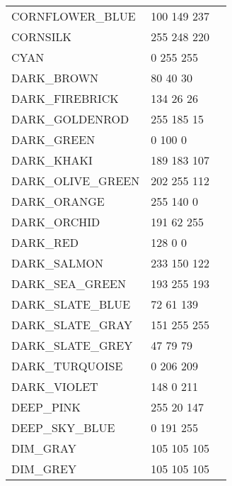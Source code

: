 \begin{longtable}{l|l|l}
CORNFLOWER\_BLUE & 100 149 237 & \colorbox[RGB]{100 149 237}{\phantom{MMMMMMMM}}\\
CORNSILK & 255 248 220 & \colorbox[RGB]{255 248 220}{\phantom{MMMMMMMM}}\\
CYAN & 0 255 255 & \colorbox[RGB]{0 255 255}{\phantom{MMMMMMMM}}\\
DARK\_BROWN & 80 40 30 & \colorbox[RGB]{80 40 30}{\phantom{MMMMMMMM}}\\
DARK\_FIREBRICK & 134 26 26 & \colorbox[RGB]{134 26 26}{\phantom{MMMMMMMM}}\\
DARK\_GOLDENROD & 255 185 15 & \colorbox[RGB]{255 185 15}{\phantom{MMMMMMMM}}\\
DARK\_GREEN & 0 100 0 & \colorbox[RGB]{0 100 0}{\phantom{MMMMMMMM}}\\
DARK\_KHAKI & 189 183 107 & \colorbox[RGB]{189 183 107}{\phantom{MMMMMMMM}}\\
DARK\_OLIVE\_GREEN & 202 255 112 & \colorbox[RGB]{202 255 112}{\phantom{MMMMMMMM}}\\
DARK\_ORANGE & 255 140 0 & \colorbox[RGB]{255 140 0}{\phantom{MMMMMMMM}}\\
DARK\_ORCHID & 191 62 255 & \colorbox[RGB]{191 62 255}{\phantom{MMMMMMMM}}\\
DARK\_RED & 128 0 0 & \colorbox[RGB]{128 0 0}{\phantom{MMMMMMMM}}\\
DARK\_SALMON & 233 150 122 & \colorbox[RGB]{233 150 122}{\phantom{MMMMMMMM}}\\
DARK\_SEA\_GREEN & 193 255 193 & \colorbox[RGB]{193 255 193}{\phantom{MMMMMMMM}}\\
DARK\_SLATE\_BLUE & 72 61 139 & \colorbox[RGB]{72 61 139}{\phantom{MMMMMMMM}}\\
DARK\_SLATE\_GRAY & 151 255 255 & \colorbox[RGB]{151 255 255}{\phantom{MMMMMMMM}}\\
DARK\_SLATE\_GREY & 47 79 79 & \colorbox[RGB]{47 79 79}{\phantom{MMMMMMMM}}\\
DARK\_TURQUOISE & 0 206 209 & \colorbox[RGB]{0 206 209}{\phantom{MMMMMMMM}}\\
DARK\_VIOLET & 148 0 211 & \colorbox[RGB]{148 0 211}{\phantom{MMMMMMMM}}\\
DEEP\_PINK & 255 20 147 & \colorbox[RGB]{255 20 147}{\phantom{MMMMMMMM}}\\
DEEP\_SKY\_BLUE & 0 191 255 & \colorbox[RGB]{0 191 255}{\phantom{MMMMMMMM}}\\
DIM\_GRAY & 105 105 105 & \colorbox[RGB]{105 105 105}{\phantom{MMMMMMMM}}\\
DIM\_GREY & 105 105 105 & \colorbox[RGB]{105 105 105}{\phantom{MMMMMMMM}}\\

\end{longtable}
